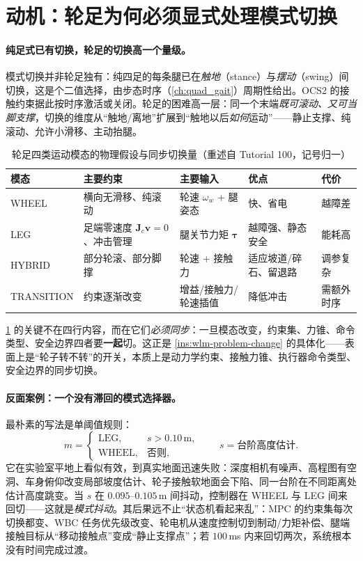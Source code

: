 \section{动机：轮足为何必须显式处理模式切换}
\label{sec:wlm-motivation}

\paragraph{纯足式已有切换，轮足的切换高一个量级。}
模式切换并非轮足独有：纯四足的每条腿已在\emph{触地}（stance）与\emph{摆动}（swing）间切换，这是个二值选择，由步态时序（\cref{ch:quad_gait}）周期性给出。OCS2 的接触约束据此按时序激活或关闭。轮足的困难高一层：同一个末端\emph{既可滚动、又可当脚支撑}，切换的维度从“触地/离地”扩展到“触地以后\emph{如何}运动”——静止支撑、纯滚动、允许小滑移、主动抬腿。

\begin{table}[H]\centering\small
\caption{轮足四类运动模态的物理假设与同步切换量（重述自 Tutorial 100，记号归一）}
\label{tab:wlm-modes}
\begin{tabular}{lllll}
\toprule
模态 & 主要约束 & 主要输入 & 优点 & 代价 \\
\midrule
WHEEL & 横向无滑移、纯滚动 & 轮速 $\omega_w$ + 腿姿态 & 快、省电 & 越障差 \\
LEG & 足端零速度 $\mathbf J_c\mathbf v=0$、冲击管理 & 腿关节力矩 $\boldsymbol\tau$ & 越障强、静态安全 & 能耗高 \\
HYBRID & 部分轮滚、部分脚撑 & 轮速 + 接触力 & 适应坡道/碎石、留退路 & 调参复杂 \\
TRANSITION & 约束逐渐改变 & 增益/接触力/轮速插值 & 降低冲击 & 需额外时序 \\
\bottomrule
\end{tabular}
\end{table}

\noindent\cref{tab:wlm-modes} 的关键不在四行内容，而在它们\emph{必须同步}：一旦模态改变，约束集、力锥、命令类型、安全边界四者要\textbf{一起}切。这正是 \cref{ins:wlm-problem-change} 的具体化——表面上是“轮子转不转”的开关，本质上是动力学约束、接触力锥、执行器命令类型、安全边界的同步切换。

\paragraph{反面案例：一个没有滞回的模式选择器。}
最朴素的写法是单阈值规则：
\begin{equation}
  m=\begin{cases}\mathrm{LEG}, & s>0.10\,\mathrm m,\\[2pt]\mathrm{WHEEL}, & \text{否则},\end{cases}
  \qquad s=\text{台阶高度估计}.
  \label{eq:wlm-naive}
\end{equation}
它在实验室平地上看似有效，到真实地面迅速失败：深度相机有噪声、高程图有空洞、车身俯仰改变局部坡度估计、轮子接触软地面会下陷、同一台阶在不同距离处估计高度跳变。当 $s$ 在 $0.095$–$0.105\,$m 间抖动，控制器在 WHEEL 与 LEG 间来回切——这就是\emph{模式抖动}。其后果远不止“状态机看起来乱”：MPC 的约束集每次切换都变、WBC 任务优先级改变、轮电机从速度控制切到制动/力矩补偿、腿端接触目标从“移动接触点”变成“静止支撑点”；若 $100\,$ms 内来回切两次，系统根本没有时间完成过渡。

